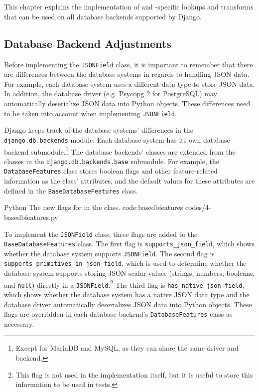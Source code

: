 \chapter{\babEmpat}

This chapter explains the implementation of  and
-specific lookups and transforms that can be used on all
database backends supported by Django.

\section{Database Backend Adjustments}

Before implementing the \verb|JSONField| class, it is important to remember
that there are differences between the database systems in regards to handling
JSON data. For example, each database system uses a different data type to
store JSON data. In addition, the database driver (e.g. Psycopg 2 for
PostgreSQL) may automatically deserialize JSON data into Python objects. These
differences need to be taken into account when implementing \verb|JSONField|.

Django keeps track of the database systems' differences in the
\verb|django.db.backends| module. Each database system has its own database
backend submodule.\footnote{Except for MariaDB and MySQL, as they can share the
same driver and backend.} The database backends' classes are extended from the
classes in the \verb|django.db.backends.base| submodule. For example, the
\verb|DatabaseFeatures| class stores boolean flags and other feature-related
information as the class' attributes, and the default values for these
attributes are defined in the \verb|BaseDatabaseFeatures| class.

\listing
{Python}
{The new flags for  in the  class.}
{code:basedbfeatures}
{codes/4-basedbfeatures.py}

To implement the \verb|JSONField| class, three flags are added to the
\verb|BaseDatabaseFeatures| class. The first flag is
\verb|supports_json_field|, which shows whether the database system supports
\verb|JSONField|. The second flag is \verb|supports_primitives_in_json_field|,
which is used to determine whether the database system supports storing JSON
scalar values (strings, numbers, booleans, and \verb|null|) directly in a
\verb|JSONField|.\footnote{This flag is not used in the 
implementation itself, but it is useful to store this information to be used in
tests.} The third flag is \verb|has_native_json_field|, which shows whether the
database system has a native JSON data type and the database driver
automatically deserializes JSON data into Python objects. These flags are
overridden in each database backend's \verb|DatabaseFeatures| class as
necessary.

